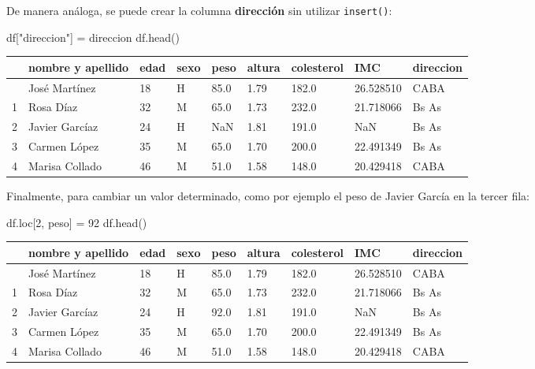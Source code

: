 \documentclass[
  letterpaper,
  DIV=11,
  numbers=noendperiod]{scrreprt}
\newenvironment{Shaded}{\begin{snugshade}}{\end{snugshade}}
\newcommand{\DecValTok}[1]{\textcolor[rgb]{0.68,0.00,0.00}{#1}}
\newcommand{\NormalTok}[1]{\textcolor[rgb]{0.00,0.23,0.31}{#1}}
\newcommand{\OperatorTok}[1]{\textcolor[rgb]{0.37,0.37,0.37}{#1}}
\newcommand{\StringTok}[1]{\textcolor[rgb]{0.13,0.47,0.30}{#1}}
\begin{document}
De manera análoga, se puede crear la columna \textbf{dirección} sin
utilizar \texttt{insert()}:

\begin{Shaded}
\begin{Highlighting}[]
\NormalTok{df[}\StringTok{"direccion"}\NormalTok{] }\OperatorTok{=}\NormalTok{ direccion}
\NormalTok{df.head()}
\end{Highlighting}
\end{Shaded}

\begin{longtable}[]{@{}lllllllll@{}}
\toprule\noalign{}
& nombre y apellido & edad & sexo & peso & altura & colesterol & IMC &
direccion \\
\midrule\noalign{}
\endhead
\bottomrule\noalign{}
\endlastfoot
0 & José Martínez & 18 & H & 85.0 & 1.79 & 182.0 & 26.528510 & CABA \\
1 & Rosa Díaz & 32 & M & 65.0 & 1.73 & 232.0 & 21.718066 & Bs As \\
2 & Javier Garcíaz & 24 & H & NaN & 1.81 & 191.0 & NaN & Bs As \\
3 & Carmen López & 35 & M & 65.0 & 1.70 & 200.0 & 22.491349 & Bs As \\
4 & Marisa Collado & 46 & M & 51.0 & 1.58 & 148.0 & 20.429418 & CABA \\
\end{longtable}

Finalmente, para cambiar un valor determinado, como por ejemplo el peso
de Javier García en la tercer fila:

\begin{Shaded}
\begin{Highlighting}[]
\NormalTok{df.loc[}\DecValTok{2}\NormalTok{, }\StringTok{\textquotesingle{}peso\textquotesingle{}}\NormalTok{] }\OperatorTok{=} \DecValTok{92}
\NormalTok{df.head()}
\end{Highlighting}
\end{Shaded}

\begin{longtable}[]{@{}lllllllll@{}}
\toprule\noalign{}
& nombre y apellido & edad & sexo & peso & altura & colesterol & IMC &
direccion \\
\midrule\noalign{}
\endhead
\bottomrule\noalign{}
\endlastfoot
0 & José Martínez & 18 & H & 85.0 & 1.79 & 182.0 & 26.528510 & CABA \\
1 & Rosa Díaz & 32 & M & 65.0 & 1.73 & 232.0 & 21.718066 & Bs As \\
2 & Javier Garcíaz & 24 & H & 92.0 & 1.81 & 191.0 & NaN & Bs As \\
3 & Carmen López & 35 & M & 65.0 & 1.70 & 200.0 & 22.491349 & Bs As \\
4 & Marisa Collado & 46 & M & 51.0 & 1.58 & 148.0 & 20.429418 & CABA \\
\end{longtable}
\end{document}
